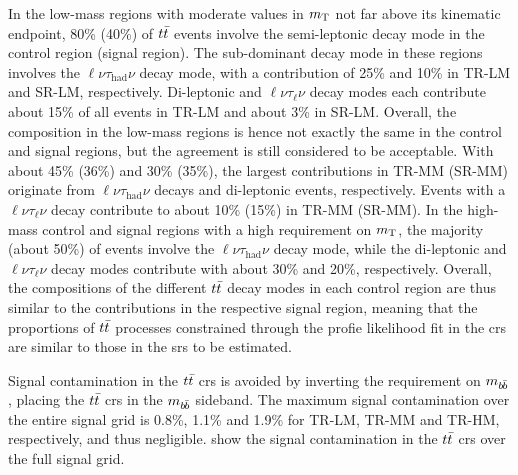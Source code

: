  In the low-mass regions with moderate values in $m_{\textrm{T}}$ not far above its kinematic endpoint, 80\% (40\%) of $t\bar{t}$ events involve the semi-leptonic decay mode in the control region (signal region).
 The sub-dominant decay mode in these regions involves the $\ell\nu\tau_\mathrm{had}\nu$ decay mode, with a contribution of 25\% and 10\% in TR-LM and SR-LM, respectively.
 Di-leptonic and $\ell\nu\tau_\mathrm{\ell}\nu$ decay modes each contribute about 15\% of all events in TR-LM and about 3\% in SR-LM.
 Overall, the composition in the low-mass regions is hence not exactly the same in the control and signal regions, but the agreement is still considered to be acceptable.
 With about 45\% (36\%) and 30\% (35\%), the largest contributions in TR-MM (SR-MM) originate from $\ell\nu\tau_\mathrm{had}\nu$ decays and di-leptonic events, respectively.
 Events with a $\ell\nu\tau_\mathrm{\ell}\nu$ decay contribute to about 10\% (15\%) in TR-MM (SR-MM). 
 In the high-mass control and signal regions with a high requirement on $m_{\textrm{T}}$, the majority (about 50\%) of events involve the $\ell\nu\tau_\mathrm{had}\nu$ decay mode, while the di-leptonic and $\ell\nu\tau_\mathrm{\ell}\nu$ decay modes contribute with about 30\% and 20\%, respectively.
 Overall, the compositions of the different $t\bar{t}$ decay modes in each control region are thus similar to the contributions in the respective signal region, meaning that the proportions of $t\bar{t}$ processes constrained through the profie likelihood fit in the \glspl{cr} are similar to those in the \glspl{sr} to be estimated.

Signal contamination in the $t\bar{t}$ \glspl{cr} is avoided by inverting the requirement on $m_{b\hspace{-0.06em}\bar{b}}$, \ie placing the $t\bar{t}$ \glspl{cr} in the $m_{b\hspace{-0.06em}\bar{b}}$ sideband.
The maximum signal contamination over the entire signal grid is 0.8\%, 1.1\% and 1.9\% for TR-LM, TR-MM and TR-HM, respectively, and thus negligible.  show the signal contamination in the $t\bar{t}$ \glspl{cr} over the full signal grid. 


